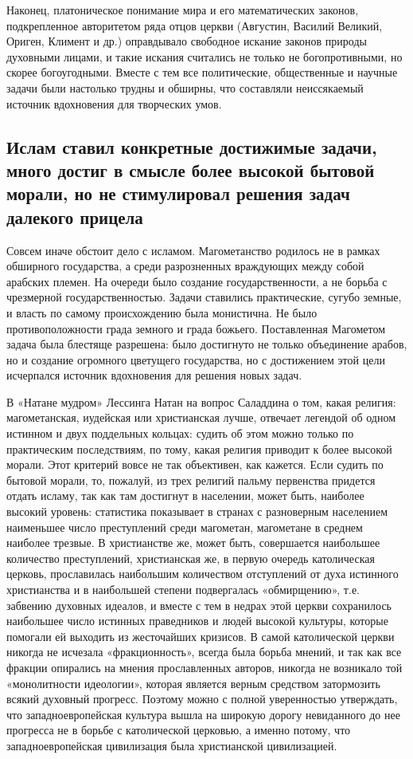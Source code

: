 Наконец, платоническое понимание мира и его математических законов,
подкрепленное авторитетом ряда отцов церкви (Августин, Василий
Великий, Ориген, Климент и др.) оправдывало свободное искание законов
природы духовными лицами, и такие искания считались не только не
богопротивными, но скорее богоугодными. Вместе с тем все политические,
общественные и научные задачи были настолько трудны и обширны, что
составляли неиссякаемый источник вдохновения для творческих умов.

\subsection{Ислам ставил конкретные достижимые задачи, много достиг в
смысле более высокой бытовой морали, но не стимулировал
решения задач далекого прицела}

Совсем иначе обстоит дело с исламом. Магометанство родилось не в
рамках обширного государства, а среди разрозненных враждующих между
собой арабских племен. На очереди было создание государственности, а
не борьба с чрезмерной государственностью. Задачи ставились
практические, сугубо земные, и власть по самому происхождению была
монистична. Не было противоположности града земного и града божьего.
Поставленная Магометом задача была блестяще разрешена: было достигнуто
не только объединение арабов, но и создание огромного цветущего
государства, но с достижением этой цели исчерпался источник
вдохновения для решения новых задач.

В «Натане мудром» Лессинга Натан на вопрос Саладдина о том, какая
религия: магометанская, иудейская или христианская лучше, отвечает
легендой об одном истинном и двух поддельных кольцах: судить об этом
можно только по практическим последствиям, по тому, какая религия
приводит к более высокой морали. Этот критерий вовсе не так
объективен, как кажется. Если судить по бытовой морали, то, пожалуй,
из трех религий пальму первенства придется отдать исламу, так как там
достигнут в населении, может быть, наиболее высокий уровень:
статистика показывает в странах с разноверным населением наименьшее
число преступлений среди магометан, магометане в среднем наиболее
трезвые. В христианстве же, может быть, совершается наибольшее
количество преступлений, христианская же, в первую очередь
католическая церковь, прославилась наибольшим количеством отступлений
от духа истинного христианства и в наибольшей степени подвергалась
«обмирщению», т.е. забвению духовных идеалов, и вместе с тем в недрах
этой церкви сохранилось наибольшее число истинных праведников и людей
высокой культуры, которые помогали ей выходить из жесточайших
кризисов. В самой католической церкви никогда не исчезала
«фракционность», всегда была борьба мнений, и так как все фракции
опирались на мнения прославленных авторов, никогда не возникало той
«монолитности идеологии», которая является верным средством
затормозить всякий духовный прогресс. Поэтому можно с полной
уверенностью утверждать, что западноевропейская культура вышла на
широкую дорогу невиданного до нее прогресса не в борьбе с католической
церковью, а именно потому, что западноевропейская цивилизация была
христианской цивилизацией.

